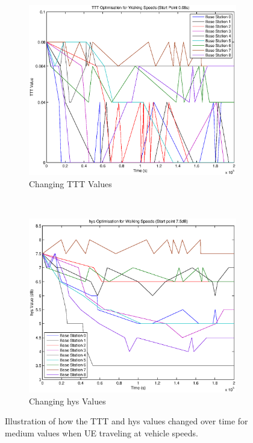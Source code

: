 \begin{figure}[H]
        \centering
        \begin{subfigure}[b]{0.49\textwidth}
                \includegraphics[width=\textwidth]{figures/walking_figures/highhys/long_ttt.eps}
                \caption{Changing TTT Values}
                \label{fig:walk_highhys_ttt}
        \end{subfigure}%
        ~ %
        \begin{subfigure}[b]{0.49\textwidth}
                \includegraphics[width=\textwidth]{figures/walking_figures/highhys/long_hys.eps}
                \caption{Changing hys Values}
                \label{fig:walk_highhys_hys}
        \end{subfigure}
        \caption{Illustration of how the TTT and hys values changed over time for medium values when UE traveling at vehicle speeds.}\label{fig:walk_highhys_ttthys}
\end{figure}

